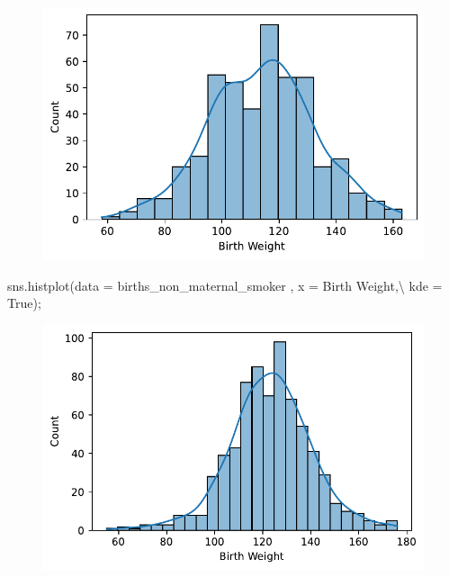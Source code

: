 \documentclass[
  letterpaper,
  DIV=11,
  numbers=noendperiod]{scrreprt}
\newenvironment{Shaded}{\begin{snugshade}}{\end{snugshade}}
\newcommand{\NormalTok}[1]{\textcolor[rgb]{0.00,0.23,0.31}{#1}}
\newcommand{\OperatorTok}[1]{\textcolor[rgb]{0.37,0.37,0.37}{#1}}
\newcommand{\StringTok}[1]{\textcolor[rgb]{0.13,0.47,0.30}{#1}}
\newcommand{\VariableTok}[1]{\textcolor[rgb]{0.07,0.07,0.07}{#1}}
\begin{document}
\begin{figure}[H]

{\centering \includegraphics{visualization_1/visualization_1_files/figure-pdf/cell-16-output-1.pdf}

}

\end{figure}

\begin{Shaded}
\begin{Highlighting}[]
\NormalTok{sns.histplot(data }\OperatorTok{=}\NormalTok{ births\_non\_maternal\_smoker , x }\OperatorTok{=} \StringTok{\textquotesingle{}Birth Weight\textquotesingle{}}\NormalTok{,}\OperatorTok{\textbackslash{}}
\NormalTok{             kde }\OperatorTok{=} \VariableTok{True}\NormalTok{)}\OperatorTok{;}
\end{Highlighting}
\end{Shaded}

\begin{figure}[H]

{\centering \includegraphics{visualization_1/visualization_1_files/figure-pdf/cell-17-output-1.pdf}

}

\end{figure}
\end{document}
